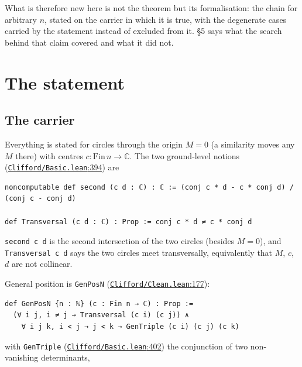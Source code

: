 \documentclass[11pt]{article}
\theoremstyle{definition}
\theoremstyle{remark}
\begin{document}
What is therefore new here is not the theorem but its formalisation: the chain for arbitrary \(n\), stated
on the carrier in which it is true, with the degenerate cases carried by the statement instead of
excluded from it. \S{}5 says what the search behind that claim covered and what it did not.

\hypertarget{the-statement}{%
\section{The statement}\label{the-statement}}

\hypertarget{the-carrier}{%
\subsection{The carrier}\label{the-carrier}}

Everything is stated for circles through the origin \(M = 0\) (a similarity moves any \(M\) there) with
centres \(c : \mathrm{Fin}\,n \to \mathbb{C}\). The two ground-level notions (\href{https://github.com/jpbald93/paperl_clifford_chain/blob/e1ae145c2565cc98816635387412edc0a740c27c/Clifford/Basic.lean\#L394}{\texttt{Clifford/\allowbreak Basic.lean}:394})
are

\begin{Verbatim}
noncomputable def second (c d : ℂ) : ℂ := (conj c * d - c * conj d) / (conj c - conj d)

def Transversal (c d : ℂ) : Prop := conj c * d ≠ c * conj d
\end{Verbatim}

\texttt{second\ c\ d} is the second intersection of the two circles (besides \(M = 0\)), and \texttt{Transversal\ c\ d} says
the two circles meet transversally, equivalently that \(M\), \(c\), \(d\) are not collinear.

General position is \texttt{GenPosN} (\href{https://github.com/jpbald93/paperl_clifford_chain/blob/e1ae145c2565cc98816635387412edc0a740c27c/Clifford/Clean.lean\#L177}{\texttt{Clifford/\allowbreak Clean.lean}:177}):

\begin{Verbatim}
def GenPosN {n : ℕ} (c : Fin n → ℂ) : Prop :=
  (∀ i j, i ≠ j → Transversal (c i) (c j)) ∧
    ∀ i j k, i < j → j < k → GenTriple (c i) (c j) (c k)
\end{Verbatim}

with \texttt{GenTriple} (\href{https://github.com/jpbald93/paperl_clifford_chain/blob/e1ae145c2565cc98816635387412edc0a740c27c/Clifford/Basic.lean\#L402}{\texttt{Clifford/\allowbreak Basic.lean}:402}) the conjunction of two non-vanishing determinants,
\end{document}
